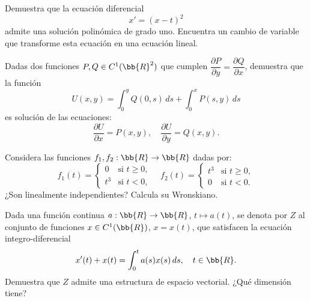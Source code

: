 \documentclass[12pt]{article}
\begin{document}
    \begin{ejercicio}
        Demuestra que la ecuación diferencial
        \begin{equation*}
            x' = (x - t)^2
        \end{equation*}
        admite una solución polinómica de grado uno. Encuentra un cambio de variable que transforme esta ecuación en una ecuación lineal.
    \end{ejercicio}

    \begin{ejercicio}
        Dadas dos funciones $P,Q \in C^1(\bb{R}^2)$ que cumplen $\dfrac{\partial P}{\partial y} = \dfrac{\partial Q}{\partial x}$, demuestra que la función
        \begin{equation*}
            U(x,y) = \int_0^y Q(0,s)\,ds + \int_0^x P(s,y)\,ds
        \end{equation*}
        es solución de las ecuaciones:
        \begin{equation*}
            \dfrac{\partial U}{\partial x} = P(x,y), \quad \dfrac{\partial U}{\partial y} = Q(x,y).
        \end{equation*}
    \end{ejercicio}

    \begin{ejercicio}
        Considera las funciones $f_1,f_2:\bb{R}\to \bb{R}$ dadas por:
        \begin{equation*}
            f_1(t) = \begin{cases}
                0 & \text{si } t \geq 0,\\
                t^3 & \text{si } t < 0,
            \end{cases} \quad f_2(t) = \begin{cases}
                t^3 & \text{si } t \geq 0,\\
                0 & \text{si } t < 0.
            \end{cases}
        \end{equation*}
        ¿Son linealmente independientes? Calcula su Wronskiano.
    \end{ejercicio}

    \begin{ejercicio}
        Dada una función continua $a:\bb{R}\to \bb{R}$, $t \mapsto a(t)$, se denota por $Z$ al conjunto de funciones $x \in C^1(\bb{R})$, $x = x(t)$, que satisfacen la ecuación integro-diferencial
        \begin{equation*}
            x'(t) + x(t) = \int_0^t a(s)x(s)\,ds, \quad t \in \bb{R}.
        \end{equation*}
        Demuestra que $Z$ admite una estructura de espacio vectorial. ¿Qué dimensión tiene?
    \end{ejercicio}
\end{document}
